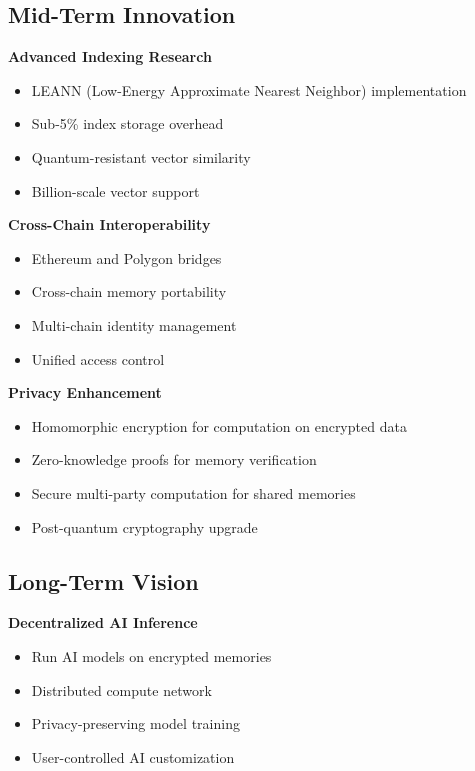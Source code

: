 \documentclass[12pt, a4paper]{article}
\begin{document}
\subsection{Mid-Term Innovation}

\textbf{Advanced Indexing Research}
\begin{itemize}
    \item LEANN (Low-Energy Approximate Nearest Neighbor) implementation
    \item Sub-5\% index storage overhead
    \item Quantum-resistant vector similarity
    \item Billion-scale vector support
\end{itemize}

\textbf{Cross-Chain Interoperability}
\begin{itemize}
    \item Ethereum and Polygon bridges
    \item Cross-chain memory portability
    \item Multi-chain identity management
    \item Unified access control
\end{itemize}

\textbf{Privacy Enhancement}
\begin{itemize}
    \item Homomorphic encryption for computation on encrypted data
    \item Zero-knowledge proofs for memory verification
    \item Secure multi-party computation for shared memories
    \item Post-quantum cryptography upgrade
\end{itemize}

\subsection{Long-Term Vision}

\textbf{Decentralized AI Inference}
\begin{itemize}
    \item Run AI models on encrypted memories
    \item Distributed compute network
    \item Privacy-preserving model training
    \item User-controlled AI customization
\end{itemize}
\end{document}
